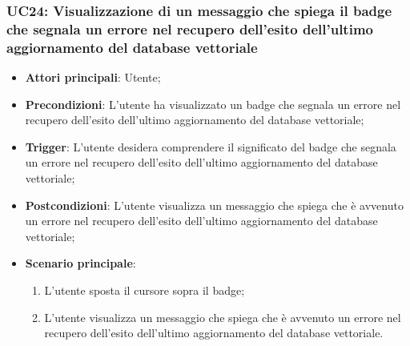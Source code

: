 \subsubsection{UC24: Visualizzazione di un messaggio che spiega il badge che segnala un errore nel recupero dell'esito dell'ultimo aggiornamento del database vettoriale}
\begin{itemize}
    \item \textbf{Attori principali}: Utente;
    \item \textbf{Precondizioni}: L'utente ha visualizzato un badge che segnala un errore nel recupero dell'esito dell'ultimo aggiornamento del database vettoriale;
    \item \textbf{Trigger}: L'utente desidera comprendere il significato del badge che segnala un errore nel recupero dell'esito dell'ultimo aggiornamento del database vettoriale;
    \item \textbf{Postcondizioni}: L'utente visualizza un messaggio che spiega che è avvenuto un errore nel recupero dell'esito dell'ultimo aggiornamento del database vettoriale;
    \item \textbf{Scenario principale}:
    \begin{enumerate}
        \item L'utente sposta il cursore sopra il badge;
        \item L'utente visualizza un messaggio che spiega che è avvenuto un errore nel recupero dell'esito dell'ultimo aggiornamento del database vettoriale.
    \end{enumerate}
\end{itemize}
